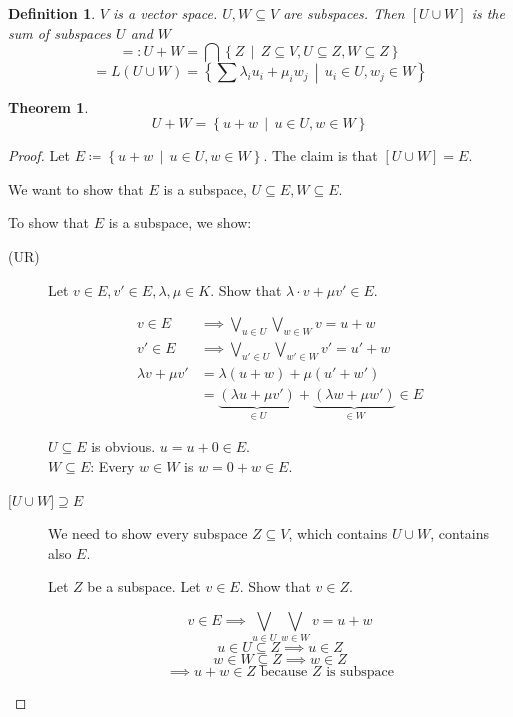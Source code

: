 \documentclass[a4paper,landscape,twocolumn]{article}
\newcommand\setdef[2]{\left\{#1\,\middle|\,#2\right\}}
\newtheorem{theorem}{Theorem}[section]
\newtheorem{defi}{Definition}[section]
\begin{document}
\begin{defi}
  $V$ is a vector space. $U, W \subseteq V$ are subspaces.
  Then $[U \cup W]$ is the \emph{sum of subspaces $U$ and $W$}
  \[
      =: U+W
      = \bigcap \setdef{Z}{Z \subseteq V, U \subseteq Z, W \subseteq Z}
  \] \[
      = L(U \cup W)
      = \setdef{\sum \lambda_i u_i + \mu_i w_j}{u_i \in U, w_j \in W}
  \]
\end{defi}

\begin{theorem}
  \label{satz-4-2}
  \[ U + W = \setdef{u+w}{u \in U, w \in W} \]
\end{theorem}

\begin{proof}
  Let $E \coloneqq \setdef{u+w}{u \in U, w \in W}$.
  The claim is that $\left[U \cup W\right] = E$.

  We want to show that $E$ is a subspace, $U \subseteq E, W \subseteq E$.

  To show that $E$ is a subspace, we show:
  \begin{description}
    \item[(UR)] Let $v \in E, v' \in E, \lambda, \mu \in K$.
      Show that $\lambda \cdot v + \mu v' \in E$.

      \begin{align*}
         v \in E &\implies \bigvee_{u \in U} \bigvee_{w \in W} v = u + w \\
         v' \in E &\implies \bigvee_{u' \in U} \bigvee_{w' \in W} v' = u' + w \\
         \lambda v + \mu v' &= \lambda(u + w) + \mu(u' + w') \\
         &= \underbrace{(\lambda u + \mu v')}_{\in U} + \underbrace{(\lambda w + \mu w')}_{\in W} \in E
      \end{align*}

      $U \subseteq E$ is obvious. $u = u + 0 \in E$. \\
      $W \subseteq E$: Every $w \in W$ is $w = 0 + w \in E$.

    \item[${[}U \cup W{]} \supseteq E$]
      We need to show every subspace $Z \subseteq V$, which contains $U \cup W$, contains also $E$.

      Let $Z$ be a subspace. Let $v \in E$. Show that $v \in Z$.

      \[ v \in E \implies \bigvee_{u \in U} \bigvee_{w \in W} v = u + w \]
      \[ u \in U \subseteq Z \implies u \in Z \]
      \[ w \in W \subseteq Z \implies w \in Z \]
      \[ \implies u + w \in Z \text{ because } Z \text{ is subspace} \]
  \end{description}
\end{proof}
\end{document}
